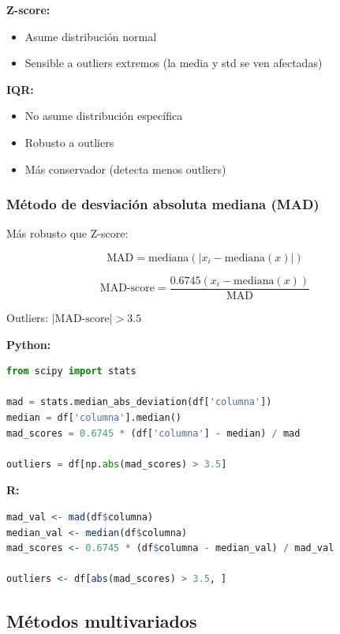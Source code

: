 \documentclass[a4paper,11pt]{article}
\begin{document}
\begin{tcolorbox}[colback=advertenciacolor!20, colframe=red, title=Z-score vs IQR]
\textbf{Z-score:}
\begin{itemize}
    \item Asume distribución normal
    \item Sensible a outliers extremos (la media y std se ven afectadas)
\end{itemize}

\textbf{IQR:}
\begin{itemize}
    \item No asume distribución específica
    \item Robusto a outliers
    \item Más conservador (detecta menos outliers)
\end{itemize}
\end{tcolorbox}

\subsubsection{Método de desviación absoluta mediana (MAD)}

Más robusto que Z-score:

$$\text{MAD} = \text{mediana}(|x_i - \text{mediana}(x)|)$$

$$\text{MAD-score} = \frac{0.6745(x_i - \text{mediana}(x))}{\text{MAD}}$$

Outliers: $|\text{MAD-score}| > 3.5$

\textbf{Python:}
\begin{lstlisting}[language=Python]
from scipy import stats

mad = stats.median_abs_deviation(df['columna'])
median = df['columna'].median()
mad_scores = 0.6745 * (df['columna'] - median) / mad

outliers = df[np.abs(mad_scores) > 3.5]
\end{lstlisting}

\textbf{R:}
\begin{lstlisting}[language=R]
mad_val <- mad(df$columna)
median_val <- median(df$columna)
mad_scores <- 0.6745 * (df$columna - median_val) / mad_val

outliers <- df[abs(mad_scores) > 3.5, ]
\end{lstlisting}

\subsection{Métodos multivariados}
\end{document}
